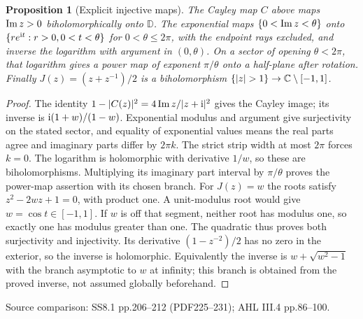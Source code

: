 \documentclass[11pt,a4paper,openany]{book}
\newtheorem{proposition}[theorem]{Proposition}
\theoremstyle{definition}
\theoremstyle{remark}\newtheorem{remark}[theorem]{Remark}
\newcommand{\D}{\mathbb D}\newcommand{\Chat}{\widehat{\mathbb C}}
\newcommand{\family}[1]{}
\newcommand{\source}[1]{\par\begingroup\small\sffamily\color{black!65}Source comparison: #1\par\endgroup}
\begin{document}
\begin{proposition}[Explicit injective maps]\family{D12.10.04}\label{d12:10-04}
The Cayley map $C$ above maps $\operatorname{Im} z>0$ biholomorphically onto $\D$. The exponential maps $\{0<\operatorname{Im} z<\theta\}$ onto $\{r e^{\mathrm i t}:r>0,0<t<\theta\}$ for $0<\theta\le2\pi$, with the endpoint rays excluded, and inverse the logarithm with argument in $(0,\theta)$. On a sector of opening $\theta<2\pi$, that logarithm gives a power map of exponent $\pi/\theta$ onto a half-plane after rotation. Finally
$J(z)=(z+z^{-1})/2$ is a biholomorphism $\{|z|>1\}\to\C\setminus[-1,1]$.
\end{proposition}
\begin{proof}
The identity $1-|C(z)|^2=4\operatorname{Im} z/|z+\mathrm i|^2$ gives the Cayley image; its inverse is $\mathrm i(1+w)/(1-w)$. Exponential modulus and argument give surjectivity on the stated sector, and equality of exponential values means the real parts agree and imaginary parts differ by $2\pi k$. The strict strip width at most $2\pi$ forces $k=0$. The logarithm is holomorphic with derivative $1/w$, so these are biholomorphisms. Multiplying its imaginary part interval by $\pi/\theta$ proves the power-map assertion with its chosen branch.
For $J(z)=w$ the roots satisfy $z^2-2wz+1=0$, with product one. A unit-modulus root would give $w=\cos t\in[-1,1]$. If $w$ is off that segment, neither root has modulus one, so exactly one has modulus greater than one. The quadratic thus proves both surjectivity and injectivity. Its derivative $(1-z^{-2})/2$ has no zero in the exterior, so the inverse is holomorphic. Equivalently the inverse is $w+\sqrt{w^2-1}$ with the branch asymptotic to $w$ at infinity; this branch is obtained from the proved inverse, not assumed globally beforehand.
\end{proof}
\source{SS8.1 pp.206--212 (PDF225--231); AHL III.4 pp.86--100.}
\end{document}
